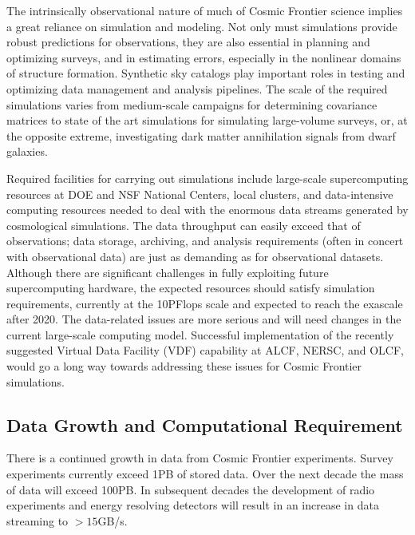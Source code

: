 The intrinsically observational nature of much of Cosmic Frontier
science implies a great reliance on simulation and modeling. Not only
must simulations provide robust predictions for observations, they are
also essential in planning and optimizing surveys, and in estimating
errors, especially in the nonlinear domains of structure
formation. Synthetic sky catalogs play important roles in testing and
optimizing data management and analysis pipelines. The scale of the
required simulations varies from medium-scale campaigns for
determining covariance matrices to state of the art simulations for
simulating large-volume surveys, or, at the opposite extreme,
investigating dark matter annihilation signals from dwarf galaxies.

Required facilities for carrying out simulations include large-scale
supercomputing resources at DOE and NSF National Centers, local
clusters, and data-intensive computing resources needed to deal with
the enormous data streams generated by cosmological simulations. The
data throughput can easily exceed that of observations; data storage,
archiving, and analysis requirements (often in concert with
observational data) are just as demanding as for observational
datasets. Although there are significant challenges in fully
exploiting future supercomputing hardware, the expected resources
should satisfy simulation requirements, currently at the 10PFlops
scale and expected to reach the exascale after 2020. The data-related
issues are more serious and will need changes in the current
large-scale computing model. Successful implementation of the recently
suggested Virtual Data Facility (VDF) capability at ALCF, NERSC, and
OLCF, would go a long way towards addressing these issues for Cosmic
Frontier simulations.

\subsection{Data Growth and Computational Requirement}

There is a continued growth in data from Cosmic Frontier
experiments. Survey experiments currently exceed 1PB of stored
data. Over the next decade the mass of data will exceed 100PB. In
subsequent decades the development of radio experiments and energy
resolving detectors will result in an increase in data streaming to
$> 15$GB/s.

